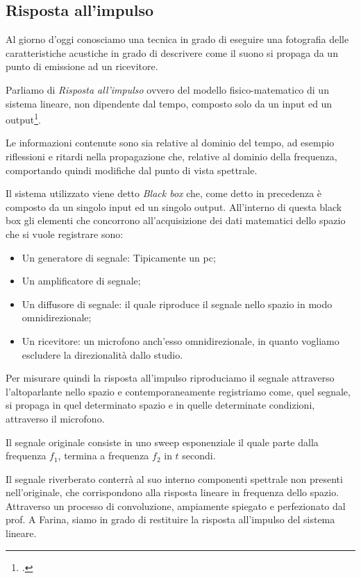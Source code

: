 \subsection{Risposta all'impulso}

Al giorno d’oggi conosciamo una tecnica in grado di eseguire una fotografia delle caratteristiche acustiche in grado di descrivere come il suono si propaga da un punto di emissione ad un ricevitore.

Parliamo di \textit{Risposta all’impulso} ovvero del modello fisico-matematico di un sistema lineare, non dipendente dal tempo, composto solo da un input ed un output\footcite{af:book}.

Le informazioni contenute sono sia relative al dominio del tempo, ad esempio riflessioni e ritardi nella propagazione che, relative al dominio della frequenza, comportando quindi modifiche dal punto di vista spettrale.

Il sistema utilizzato viene detto \textit{Black box} che, come detto in precedenza è composto da un singolo input ed un singolo output. All’interno di questa black box gli elementi che concorrono all’acquisizione dei dati matematici dello spazio che si vuole registrare sono:
\begin{itemize}
\item Un generatore di segnale: Tipicamente un pc;
\item Un amplificatore di segnale;
\item Un diffusore di segnale: il quale riproduce il segnale nello spazio in modo omnidirezionale;
\item Un ricevitore: un microfono anch’esso omnidirezionale, in quanto vogliamo escludere la direzionalità dallo studio.
\end{itemize}
Per misurare quindi la risposta all'impulso riproduciamo il segnale attraverso l’altoparlante nello spazio e contemporaneamente registriamo come, quel segnale, si propaga in quel determinato spazio e in quelle determinate condizioni, attraverso il microfono.

Il segnale originale consiste in uno sweep esponenziale il quale parte dalla frequenza $f_1$, termina a frequenza $f_2$ in $t$ secondi.

Il segnale riverberato conterrà al suo interno componenti spettrale non presenti nell’originale, che corrispondono alla risposta lineare in frequenza dello spazio.
Attraverso un processo di convoluzione, ampiamente spiegato e perfezionato dal prof. A Farina, siamo in grado di restituire la risposta all'impulso del sistema lineare.

